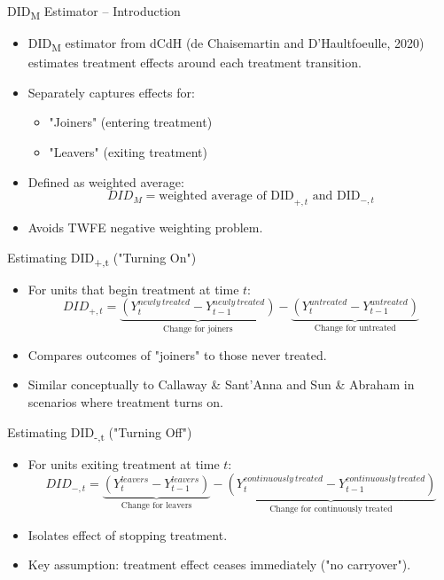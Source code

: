 \documentclass{beamer}
\begin{document}
\begin{frame}{DID\textsubscript{M} Estimator -- Introduction}
\begin{itemize}
\item DID\textsubscript{M} estimator from dCdH (de Chaisemartin and D'Haultfoeulle, 2020) estimates treatment effects around each treatment transition.
\item Separately captures effects for:
\begin{itemize}
    \item "Joiners" (entering treatment)
    \item "Leavers" (exiting treatment)
\end{itemize}
\item Defined as weighted average:
\[
DID_M = \text{weighted average of DID}_{+,t} \text{ and DID}_{-,t}
\]
\item Avoids TWFE negative weighting problem.
\end{itemize}
\end{frame}

\begin{frame}{Estimating DID\textsubscript{+,t} ("Turning On")}
\begin{itemize}
\item For units that begin treatment at time \( t \):
\[
DID_{+,t} = \underbrace{(Y_{t}^{newly\ treated} - Y_{t-1}^{newly\ treated})}_{\text{Change for joiners}} - \underbrace{(Y_{t}^{untreated} - Y_{t-1}^{untreated})}_{\text{Change for untreated}}
\]
\item Compares outcomes of "joiners" to those never treated.
\item Similar conceptually to Callaway \& Sant'Anna and Sun \& Abraham in scenarios where treatment turns on.
\end{itemize}
\end{frame}

\begin{frame}{Estimating DID\textsubscript{-,t} ("Turning Off")}
\begin{itemize}
\item For units exiting treatment at time \( t \):
\[
DID_{-,t} = \underbrace{(Y_{t}^{leavers} - Y_{t-1}^{leavers})}_{\text{Change for leavers}} - \underbrace{(Y_{t}^{continuously\ treated} - Y_{t-1}^{continuously\ treated})}_{\text{Change for continuously treated}}
\]
\item Isolates effect of stopping treatment.
\item Key assumption: treatment effect ceases immediately ("no carryover").
\end{itemize}
\end{frame}
\end{document}
